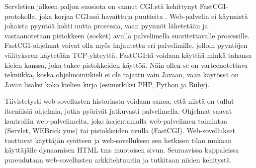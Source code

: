 Servletien jälkeen paljon suosiota on saanut CGI:stä kehittynyt FastCGI-protokolla, joka korjaa CGI:ssä havaittuja puutteita \cite{fastcgi}. Web-palvelin ei käynnistä jokaista pyyntöä kohti uutta prosessia, vaan pyynnöt lähetetään ja vastaanotetaan pistokkeen (socket) avulla palvelimella suoritettavalle prosessille. FastCGI-ohjelmat voivat olla myös hajautettu eri palvelimille, jolloin pyyntöjen välitykseen käytetään TCP-yhteyttä. FastCGI:tä voidaan käyttää minkä tahansa kielen kanssa, joka tukee pistokkeiden käyttöä. Näin ollen se on varteenotettava tekniikka, koska ohjelmointikieli ei ole rajattu vain Javaan, vaan käytössä on Javan lisäksi koko kielien kirjo (esimerkiksi PHP, Python ja Ruby).

Tiivistetysti web-sovellusten historiasta voidaan sanoa, että niistä on tullut itsenäisiä ohjelmia, jotka pyörivät jatkuvasti palvelimella. Ohjelmat saavat kontrollin web-palvelimelta, joko laajentamalla web-palvelimen toimintaa (Servlet, WEBrick yms) tai pistokkeiden avulla (FastCGI). Web-sovellukset tuottavat käyttäjän syötteen ja web-sovelluksen sen hetkisen tilan mukaan käyttäjälle dynaamisen HTML tms muotoisen sivun. Seuraavissa kappaleissa pureudutaan web-sovellusten arkkitehtuuriin ja tutkitaan niiden kehitystä.